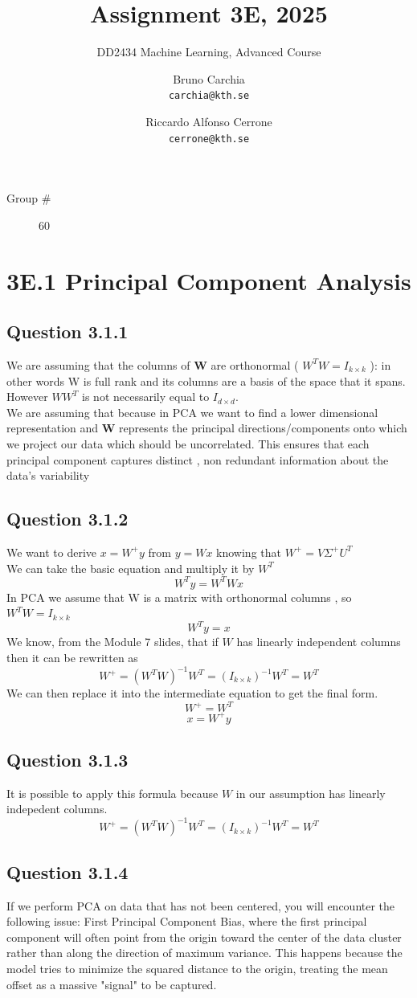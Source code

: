 \documentclass[a4paper]{scrartcl}
\title{Assignment 3E, 2025}
\subtitle{DD2434 Machine Learning, Advanced Course}
\author{
Bruno Carchia \\
\texttt{carchia@kth.se}
\and
Riccardo Alfonso Cerrone \\
  \texttt{cerrone@kth.se}
}
\begin{document}
\maketitle

\begin{description}
    \item[Group \#] 60 
\end{description}

\section*{3E.1 \quad Principal Component Analysis}
\subsection*{Question 3.1.1}
We are assuming that the columns of \textbf{W}  are orthonormal ( \(W^T W = I_{k \times  k}\) ): in other words W is full rank and its columns are a basis of the space that it spans.
However $WW^T$ is not necessarily equal to $I_{d \times d}$. \\
We are assuming that because in PCA we want to find a lower dimensional representation and \textbf{W} represents the principal directions/components onto which we project our data which should be uncorrelated. This ensures that each principal component captures distinct , non redundant information about the data's variability
\subsection*{Question 3.1.2}
We want to derive $x = W^+ y$ from $y=Wx$ knowing that $W^+ = V \Sigma^+ U^T$\\
We can take the basic equation and multiply it by $W^T$
\[
W^T y = W^T W x 
\]
In PCA we assume that W is a matrix with orthonormal columns , so $W^T W = I_{k \times k}$
\[
W^T y = x
\]
We know, from the Module 7 slides, that if $W$ has linearly independent columns then it can be rewritten as
\[
W^+ = (W^T W)^{-1} W^T = (I_{k \times k})^{-1} W^T = W^T
\]
We can then replace it into the intermediate equation to get the final form.
\[
W^+ = W^T
\]
\[
x=W^+ y
\]
\subsection*{Question 3.1.3}
It is possible to apply this formula because $W$ in our assumption has linearly indepedent columns.
\[
W^+ = (W^T W)^{-1} W^T = (I_{k \times k})^{-1} W^T = W^T
\]
\subsection*{Question 3.1.4}
If we perform PCA on data that has not been centered, you will encounter the following issue: First Principal Component Bias, where the first principal component will often point from the origin toward the center of the data cluster rather than along the direction of maximum variance. This happens because the model tries to minimize the squared distance to the origin, treating the mean offset as a massive "signal" to be captured.
\end{document}
